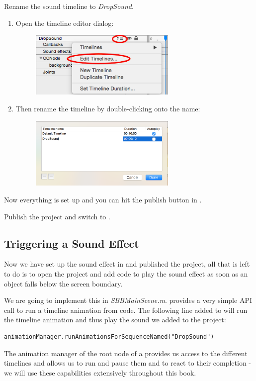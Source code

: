 \begin{leftbar}
Rename the sound timeline to  \textit{DropSound}\label{timeline_rename}.
\begin{enumerate}
  \item Open the timeline editor dialog:
  \begin{figure}[H]
    \centering
    \includegraphics[width=200pt]{images/Chapter2/edit_timeline.png} 
  \end{figure}
  \item Then rename the timeline by double-clicking onto the name:
  \begin{figure}[H]
    \centering
    \includegraphics[width=200pt]{images/Chapter2/rename_timeline.png}
  \end{figure}
\end{enumerate}

\end{leftbar}

Now everything is set up and you can hit the publish button in \SB{}.

\begin{leftbar}
Publish the \SB{} project and switch to \xcode{}.
\end{leftbar}

\subsection{Triggering a Sound Effect}
Now we have set up the sound effect in \SB{} and published the project, all that
is left to do is to open the \xcode{} project and add code to play the sound
effect as soon as an object falls below the screen boundary.

We are going to implement this in \textit{SBBMainScene.m}. \cocos{} provides a
very simple API call to run a timeline animation from code. The following line
added to  will run the timeline animation and thus play the
sound we added to the project:
\begin{lstlisting}
animationManager.runAnimationsForSequenceNamed("DropSound")
\end{lstlisting}
The animation manager of the root node of a \ccbfile{} provides us access to the
different timelines and allows us to run and pause them and to react to their
completion - we will use these capabilities extensively throughout this book.

